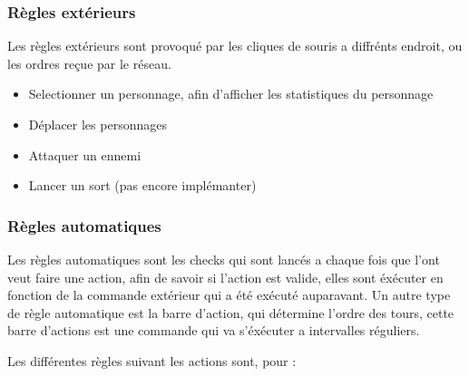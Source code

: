\documentclass[a4paper,12pt]{article}
\begin{document}
\subsubsection{Règles extérieurs}

Les règles extérieurs sont provoqué par les cliques de souris a diffrénts endroit, 
ou les ordres reçue par le réseau.

\begin{itemize}
  \item Selectionner un personnage, afin d'afficher les statistiques du personnage
  \item Déplacer les personnages
  \item Attaquer un ennemi
  \item Lancer un sort (pas encore implémanter)
\end{itemize}

\subsubsection{Règles automatiques}

Les règles automatiques sont les checks qui sont lancés a chaque fois que l'ont veut faire
une action, afin de savoir si l'action est valide, elles sont éxécuter en fonction de 
la commande extérieur qui a été exécuté auparavant. Un autre type de règle automatique est 
la barre d'action, qui détermine l'ordre des tours, cette barre d'actions est une commande
qui va s'éxécuter a intervalles réguliers.

Les différentes règles suivant les actions sont, pour :
\end{document}
